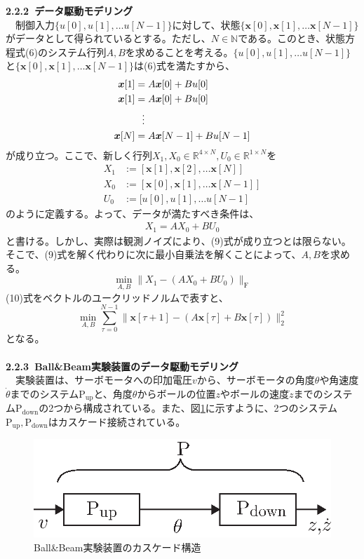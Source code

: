 \documentclass[a4paper,10.5pt]{ltjsarticle}
\begin{document}
{\large \bfseries 2.2.2 データ駆動モデリング}\\
　制御入力$\{u[0],u[1],\dots u[N-1]\}$に対して、状態$\{\bm x[0],\bm x[1],\dots {\bm x[N-1]}\}$がデータとして得られているとする。ただし、$N\in \mathbb{N}$である。このとき、状態方程式(6)のシステム行列$A,B$を求めることを考える。$\{u[0],u[1],\dots u[N-1]\}$と$\{\bm x[0],\bm x[1],\dots {\bm x[N-1]}\}$は(6)式を満たすから、
\begin{align*}
  \bm x[1]&=A\bm x[0]+Bu[0]\\
  \bm x[1]&=A\bm x[0]+Bu[0]\\
  \vdots \hspace{-10pt}\\
  \bm x[N]&=A\bm x[N-1]+Bu[N-1]
\end{align*}
が成り立つ。ここで、新しく行列$X_1,X_0\in \mathbb{R}^{4\times N},U_0\in \mathbb{R}^{1\times N}$を
\begin{align*}
  X_1&:=[\bm x[1],\bm x[2],\dots {\bm x[N]}]\\
  X_0&:=[\bm x[0],\bm x[1],\dots {\bm x[N-1]}]\\
  U_0&:=[u[0],u[1],\dots u[N-1]
\end{align*}
のように定義する。よって、データが満たすべき条件は、
\begin{align}
  X_1=AX_0+BU_0
\end{align}
と書ける。しかし、実際は観測ノイズにより、(9)式が成り立つとは限らない。そこで、(9)式を解く代わりに次に最小自乗法を解くことによって、$A,B$を求める。
\begin{equation}
  \min_{A,B}\|X_1-(AX_0+BU_0)\|_\mathrm{F}
\end{equation}
(10)式をベクトルのユークリッドノルムで表すと、
\begin{equation}
  \min_{A,B} \sum_{\tau=0}^{N-1}\|\bm x[\tau+1]-(A\bm x[\tau]+B\bm x[\tau])\|_2^2
\end{equation}
となる。\\
\\
{\large \bfseries 2.2.3 Ball\&Beam実験装置のデータ駆動モデリング}\\
　実験装置は、サーボモータへの印加電圧$v$から、サーボモータの角度$\theta$や角速度$\dot{\theta}$までのシステム$\mathrm{P_{up}}$と、角度$\theta$からボールの位置$z$やボールの速度$\dot{z}$までのシステム$\mathrm{P_{down}}$の2つから構成されている。また、図\ref{fig:figure3}に示すように、2つのシステム$\mathrm{P_{up},P_{down}}$はカスケード接続されている。\\
\begin{figure}[h]
  \centering
  \includegraphics[scale=0.9]{figure3.eps}
  \vspace{-40pt}\caption{Ball\&Beam実験装置のカスケード構造}
  \label{fig:figure3}
\end{figure}\\
\end{document}
